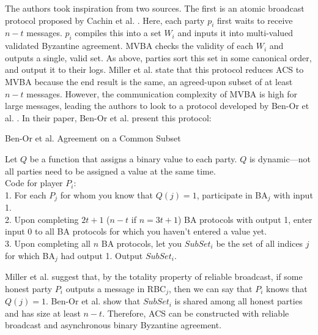 \documentclass{article}
\begin{document}
The authors took inspiration from two sources. The first is an atomic broadcast protocol proposed by Cachin et al. \cite{cachin2001secure}. Here, each party $p_i$ first waits to receive $n - t$ messages. $p_i$ compiles this into a set $W_i$ and inputs it into multi-valued validated Byzantine agreement. MVBA checks the validity of each $W_i$ and outputs a single, valid set. As above, parties sort this set in some canonical order, and output it to their logs. Miller et al. state that this protocol reduces ACS to MVBA because the end result is the same, an agreed-upon subset of at least $n - t$ messages. However, the communication complexity of MVBA is high for large messages, leading the authors to look to a protocol developed by Ben-Or et al. \cite{ben1994asynchronous}. In their paper, Ben-Or et al. present this protocol:

\begin{algorithm}\label{ben-or-prot}
\caption{Ben-Or et al. Agreement on a Common Subset \cite{ben1994asynchronous}}



Let $Q$ be a function that assigns a binary value to each party. $Q$ is dynamic---not all parties need to be assigned a value at the same time.\\
Code for player $P_i$:\\
1. For each $P_j$ for whom you know that $Q(j) = 1$, participate in BA$_j$ with input 1.\\
2. Upon completing $2t+1$ ($n - t$ if $n = 3t + 1$) BA protocols with output 1, enter input 0 to all BA protocols for which you haven't entered a value yet.\\
3. Upon completing all $n$ BA protocols, let you $SubSet_i$ be the set of all indices $j$ for which BA$_j$ had output 1. Output $SubSet_i$.

\SetAlgoLined
\SetAlgoNoEnd
\end{algorithm}

Miller et al. suggest that, by the totality property of reliable broadcast, if some honest party $P_i$ outputs a message in RBC$_j$, then we can say that $P_i$ knows that $Q(j) = 1$. Ben-Or et al. show that $SubSet_i$ is shared among all honest parties and has size at least $n - t$. Therefore, ACS can be constructed with reliable broadcast and asynchronous binary Byzantine agreement.
\end{document}
